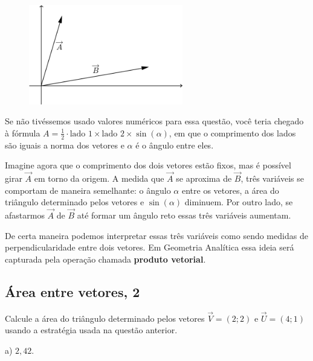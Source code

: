 \documentclass[main.tex]{subfiles}
\begin{document}
\begin{figure}[h]
\centering
\includegraphics[width=0.6\textwidth]{./img/c4q8.png}
\end{figure}

Se não tivéssemos usado valores numéricos para essa questão, você teria chegado à fórmula $A=\frac{1}{2} \cdot \text{lado 1} \times \text{lado 2} \times \sin(\alpha)$, em que o comprimento dos lados são iguais a norma dos vetores e $\alpha$ é o ângulo entre eles.

Imagine agora que o comprimento dos dois vetores estão fixos, mas é possível girar $\overrightarrow{A}$ em torno da origem. A medida que $\overrightarrow{A}$ se aproxima de $\overrightarrow{B}$, três variáveis se comportam de maneira semelhante: o ângulo $\alpha$ entre os vetores, a área do triângulo determinado pelos vetores e $\sin(\alpha)$ diminuem. Por outro lado, se afastarmos $\overrightarrow{A}$ de $\overrightarrow{B}$ até formar um ângulo reto essas três variáveis aumentam.

De certa maneira podemos interpretar essas três variáveis como sendo medidas de perpendicularidade entre dois vetores. Em Geometria Analítica essa ideia será capturada pela operação chamada \textbf{produto vetorial}.

\subsection*{Área entre vetores, 2}

\begin{questao}
Calcule a área do triângulo determinado pelos vetores $\overrightarrow{V}=(2;2)$ e $\overrightarrow{U}=(4;1)$ usando a estratégia usada na questão anterior.
\end{questao}

\begin{gabarito}
	\begin{gabaritoQuestao}
		a) $2,42$.
	\end{gabaritoQuestao}
\end{gabarito}
\end{document}
